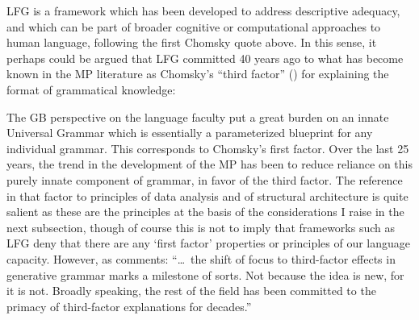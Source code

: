 \documentclass[output=paper,hidelinks]{langscibook}
\begin{document}
LFG is a framework which has been developed to address descriptive
adequacy, and which can be part of broader cognitive or computational
approaches to human language, following the first Chomsky quote above.
In this sense, it perhaps could be argued that LFG committed 40 years
ago to what has become known in the MP literature as Chomsky's ``third
factor'' (\citealp[6]{chomsky2005three}) for explaining the format of
grammatical knowledge:



The GB perspective on the language faculty put a great burden on an
innate Universal Grammar which is essentially a parameterized
blueprint for any individual grammar. This corresponds to Chomsky's
first factor. Over the last 25 years, the trend in the development of
the MP has been to reduce reliance on this purely innate component of
grammar, in favor of the third factor. The reference in that factor
to principles of data analysis and of structural architecture is quite
salient as these are the principles at the basis of the considerations
I raise in the next subsection, though of course this is not to imply
that frameworks such as LFG deny that there are any `first factor'
properties or principles of our language capacity. However, as
\citet[498]{ogrady12} comments: ``\ldots\ the shift of focus to
third-factor effects in generative grammar marks a milestone of
sorts. Not because the idea is new, for it is not. Broadly speaking,
the rest of the field has been committed to the primacy of
third-factor explanations for decades.''
\end{document}
